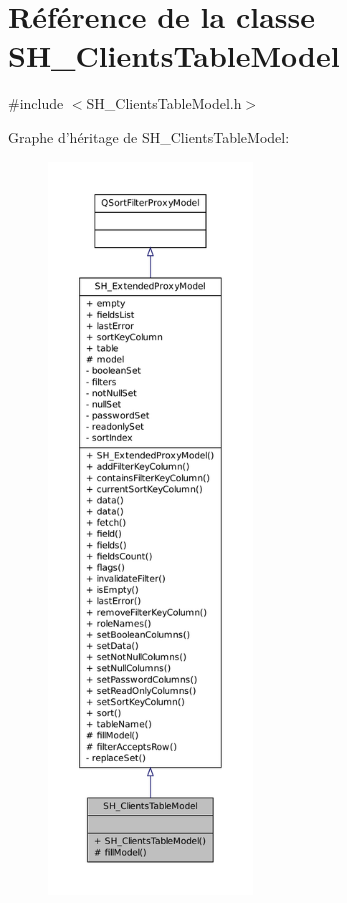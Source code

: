 \hypertarget{classSH__ClientsTableModel}{\section{Référence de la classe S\-H\-\_\-\-Clients\-Table\-Model}
\label{classSH__ClientsTableModel}
}


{\ttfamily \#include $<$S\-H\-\_\-\-Clients\-Table\-Model.\-h$>$}



Graphe d'héritage de S\-H\-\_\-\-Clients\-Table\-Model\-:\nopagebreak
\begin{figure}[H]
\begin{center}
\leavevmode
\includegraphics[height=550pt]{classSH__ClientsTableModel__inherit__graph}
\end{center}
\end{figure}


